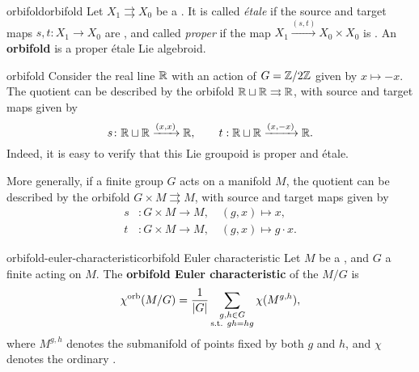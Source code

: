 \begin{topic}{orbifold}{orbifold}
    Let $X_1 \rightrightarrows X_0$ be a . It is called \textit{étale} if the source and target maps $s, t \colon X_1 \to X_0$ are , and called \textit{proper} if the map $X_1 \xrightarrow{(s, t)} X_0 \times X_0$ is . An \textbf{orbifold} is a proper étale Lie algebroid.
\end{topic}

\begin{example}{orbifold}
    Consider the real line $\mathbb{R}$ with an action of $G = \mathbb{Z}/2\mathbb{Z}$ given by $x \mapsto -x$. The quotient can be described by the orbifold $\mathbb{R} \sqcup \mathbb{R} \rightrightarrows \mathbb{R}$, with source and target maps given by
    \[ s \colon \mathbb{R} \sqcup \mathbb{R} \xrightarrow{(x, x)} \mathbb{R}, \qquad t  : \mathbb{R} \sqcup \mathbb{R} \xrightarrow{(x, -x)} \mathbb{R} . \]
    Indeed, it is easy to verify that this Lie groupoid is proper and étale.
    
    More generally, if a finite group $G$ acts on a manifold $M$, the quotient can be described by the orbifold $G \times M \rightrightarrows M$, with source and target maps given by
    \[ \begin{aligned}
        s &: G \times M \to M, \quad (g, x) \mapsto x , \\
        t &: G \times M \to M, \quad (g, x) \mapsto g \cdot x .
    \end{aligned} \]
\end{example}

\begin{topic}{orbifold-euler-characteristic}{orbifold Euler characteristic}
    Let $M$ be a  , and $G$ a finite  acting on $M$. The \textbf{orbifold Euler characteristic} of the  $M/G$ is
    \[ \chi^\textup{orb}(M/G) = \frac{1}{|G|} \sum_{\substack{g, h \in G \\ \textup{s.t. } gh = hg}} \chi(M^{g, h}) , \]
    where $M^{g, h}$ denotes the submanifold of points fixed by both $g$ and $h$, and $\chi$ denotes the ordinary .
\end{topic}

